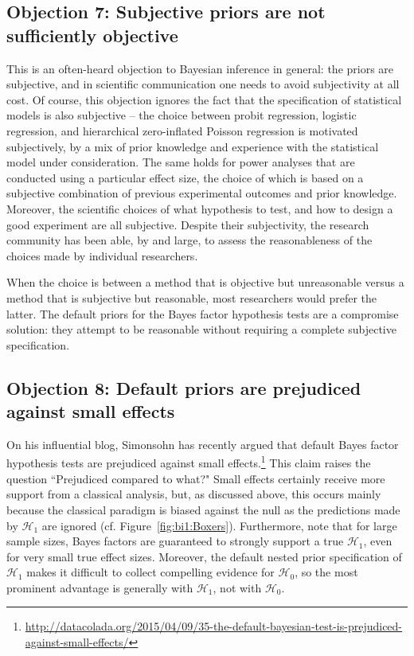 \subsection{Objection 7: Subjective priors are not sufficiently objective}
This is an often-heard objection to Bayesian inference in general: the priors are subjective, and in scientific communication one needs to avoid subjectivity at all cost. Of course, this objection ignores the fact that the specification of statistical models is also subjective -- the choice between probit regression, logistic regression, and hierarchical zero-inflated Poisson regression is motivated subjectively, by a mix of prior knowledge and experience with the statistical model under consideration. The same holds for power analyses that are conducted using a particular effect size, the choice of which is based on a subjective combination of previous experimental outcomes and prior knowledge. Moreover, the scientific choices of what hypothesis to test, and how to design a good experiment are all subjective. Despite their subjectivity, the research community has been able, by and large, to assess the reasonableness of the choices made by individual researchers.

When the choice is between a method that is objective but unreasonable versus a method that is subjective but reasonable, most researchers would prefer the latter. The default priors for the Bayes factor hypothesis tests are a compromise solution: they attempt to be reasonable without requiring a complete subjective specification.

\subsection{Objection 8: Default priors are prejudiced against small effects}
On his influential blog, Simonsohn has recently argued that default Bayes factor hypothesis tests are prejudiced against small effects.\footnote{\url{http://datacolada.org/2015/04/09/35-the-default-bayesian-test-is-prejudiced-against-small-effects/}} This claim raises the question ``Prejudiced compared to what?" Small effects certainly receive more support from a classical analysis, but, as discussed above, this occurs mainly because the classical paradigm is biased against the null as the predictions made by $\mathcal{H}_1$ are ignored (cf. Figure~\ref{fig:bi1:Boxers}). Furthermore, note that for large sample sizes, Bayes factors are guaranteed to strongly support a true $\mathcal{H}_1$, even for very small true effect sizes. Moreover, the default nested prior specification of $\mathcal{H}_1$ makes it difficult to collect compelling evidence for $\mathcal{H}_0$, so the most prominent advantage is generally with $\mathcal{H}_1$, not with $\mathcal{H}_0$.

